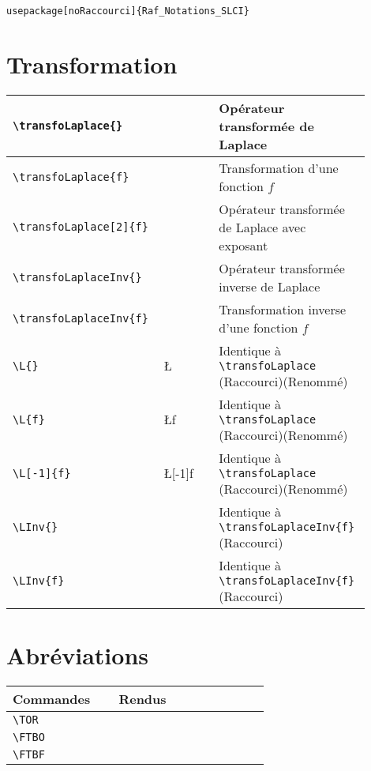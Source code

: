 \documentclass[a4paper,12pt]{article}
\newcommand{\rac}{({\color{red}Raccourci})}
\newcommand{\ren}{({\color{blue}Renommé})}
\begin{document}
	\begin{verbatim}
usepackage[noRaccourci]{Raf_Notations_SLCI}
	\end{verbatim}


	\section{Transformation}

	\begin{tabular}{|p{0.35\linewidth}|p{0.15\linewidth}|p{0.4\linewidth}|}
		\hline
			\verb!\transfoLaplace{}!	&	\transfoLaplace{} &	Opérateur transformée de Laplace
		\\\hline
			\verb!\transfoLaplace{f}!	&	\transfoLaplace{f} &	Transformation d'une fonction $f$
		\\\hline
			\verb!\transfoLaplace[2]{f}!	&	\transfoLaplace[2]{f} &	Opérateur transformée de Laplace avec exposant
		\\\hline
			\verb!\transfoLaplaceInv{}!	&	\transfoLaplaceInv{} &		Opérateur transformée inverse de Laplace
		\\\hline
			\verb!\transfoLaplaceInv{f}!	&	\transfoLaplaceInv{f} &		Transformation inverse d'une fonction $f$
		\\\hline
			\verb!\L{}!		&	\L{} 	&	Identique à \verb'\transfoLaplace' \rac\ren
		\\\hline
			\verb!\L{f}!	&	\L{f} 		&	Identique à \verb'\transfoLaplace' \rac\ren
		\\\hline
			\verb!\L[-1]{f}!	&	\L[-1]{f} &	Identique à \verb'\transfoLaplace' \rac\ren
		\\\hline
			\verb!\LInv{}!	&	\LInv{} &	Identique à \verb!\transfoLaplaceInv{f}! \rac
		\\\hline
			\verb!\LInv{f}!	&	\LInv{f} &	Identique à \verb!\transfoLaplaceInv{f}! \rac
		\\\hline
	\end{tabular}




	\section{Abréviations}
	\begin{tabular}{|p{0.35\linewidth}|p{0.5\linewidth}|}
		\hline
			\textbf{Commandes}&\textbf{Rendus}
		\\\hline\hline
			\verb!\TOR!	&	\TOR	
		\\\hline
			\verb!\FTBO!	&	\FTBO	
		\\\hline
			\verb!\FTBF!	&	\FTBF	
		\\\hline
	\end{tabular}
\end{document}
